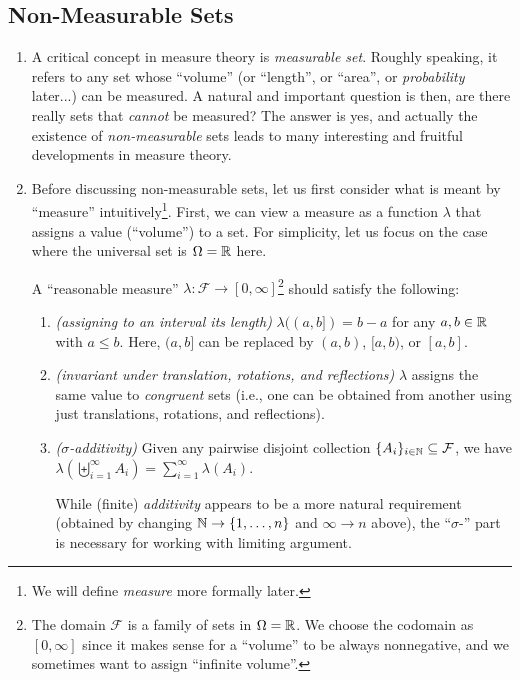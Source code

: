 \subsection{Non-Measurable Sets}
\begin{enumerate}
\item A critical concept in measure theory is \emph{measurable set}. Roughly
speaking, it refers to any set whose ``volume'' (or ``length'', or ``area'', or
\emph{probability} later...) can be measured. A natural and important question
is then, are there really sets that \emph{cannot} be measured? The answer is
yes, and actually the existence of \emph{non-measurable} sets leads to many
interesting and fruitful developments in measure theory.

\item\label{it:meas-intuitive} Before discussing non-measurable sets, let us
first consider what is meant by ``measure'' intuitively\footnote{We will define
\emph{measure} more formally later.}. First, we can view a measure as a
function \(\lambda\) that assigns a value (``volume'') to a set. For
simplicity, let us focus on the case where the universal set is
\(\Omega=\mathbb{R}\) here.

A ``reasonable measure'' \(\lambda:\mathcal{F}\to [0,\infty]\)\footnote{The
domain \(\mathcal{F}\) is a family of sets in \(\Omega=\mathbb{R}\). We choose the
codomain as \([0,\infty]\) since it makes sense for a ``volume'' to be always
nonnegative, and we sometimes want to assign ``infinite volume''.} should
satisfy the following:
\begin{enumerate}[label={(\arabic*)}]
\item \emph{(assigning to an interval its length)} \(\lambda((a,b])=b-a\) for
any \(a,b\in\mathbb{R}\) with \(a\le b\).  Here, \((a,b]\) can be replaced by
\((a,b)\), \([a,b)\), or \([a,b]\).
\item \emph{(invariant under translation, rotations, and reflections)}
\(\lambda\) assigns the same value to \emph{congruent} sets (i.e., one can be
obtained from another using just translations, rotations, and reflections).
\item \emph{(\(\sigma\)-additivity)} Given any pairwise disjoint collection
\(\{A_i\}_{i\in\mathbb{N}}\subseteq\mathcal{F}\), we have
\(\lambda(\biguplus_{i=1}^{\infty}A_i)=\sum_{i=1}^{\infty}\lambda(A_i)\).

\begin{note}
While (finite) \emph{additivity} appears to be a more natural requirement
(obtained by changing \(\mathbb{N}\to\{1,\dotsc,n\}\) and \(\infty\to n\) above), the
``\(\sigma\)-'' part is necessary for working with limiting argument.


\end{note}
\end{enumerate}
\end{enumerate}
